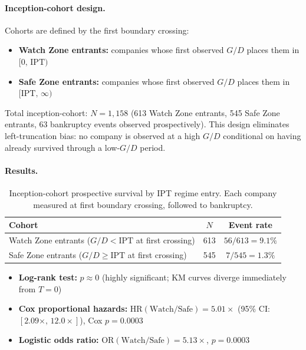 \documentclass[11pt]{article}
\theoremstyle{remark}
\newcommand{\IPT}{\mathrm{IPT}}
\begin{document}
\paragraph{Inception-cohort design.}
Cohorts are defined by the first boundary crossing:
\begin{itemize}[itemsep=2pt]
  \item \textbf{Watch Zone entrants:} companies whose first observed $G/D$ places them in $[0,\,\IPT)$
  \item \textbf{Safe Zone entrants:} companies whose first observed $G/D$ places them in $[\IPT,\,\infty)$
\end{itemize}
Total inception-cohort: $N = 1{,}158$ (613 Watch Zone entrants, 545 Safe Zone entrants, 63 bankruptcy events observed prospectively).
This design eliminates left-truncation bias: no company is observed at a high $G/D$ conditional on
having already survived through a low-$G/D$ period.

\paragraph{Results.}

\begin{table}[H]
\centering
\caption{Inception-cohort prospective survival by IPT regime entry.
Each company measured at first boundary crossing, followed to bankruptcy.}
\label{tab:inception_cohort}
\begin{tabular}{@{}lcc@{}}
\toprule
Cohort & $N$ & Event rate \\
\midrule
Watch Zone entrants ($G/D < \IPT$ at first crossing) & 613 & $56/613 = 9.1\%$ \\
Safe Zone entrants ($G/D \geq \IPT$ at first crossing) & 545 & $7/545 = 1.3\%$ \\
\bottomrule
\end{tabular}
\end{table}

\begin{itemize}[itemsep=2pt]
  \item \textbf{Log-rank test:} $p \approx 0$ (highly significant; KM curves diverge immediately from $T=0$)
  \item \textbf{Cox proportional hazards:} $\mathrm{HR}(\text{Watch}/\text{Safe}) = 5.01\times$
        (95\% CI: $[2.09\times,\,12.0\times]$), Cox $p = 0.0003$
  \item \textbf{Logistic odds ratio:} $\mathrm{OR}(\text{Watch}/\text{Safe}) = 5.13\times$,
        $p = 0.0003$
\end{itemize}
\end{document}
